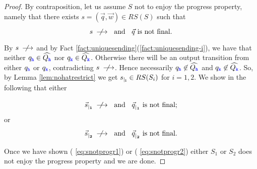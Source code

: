 \begin{proof}
By contraposition, let us assume $S$ not to enjoy the progress property, namely that there exists 
 $s= (\vec{q},\vec{w}) \in RS(S)$ such that
 \begin{equation}
 \label{eq:snotprogr}
 \text{$s\stackrel{}{\;\;\not\!\!\longrightarrow}\hspace{2mm}$ and $\hspace{2mm}\vec{q}$ is not final.}
\end{equation}


By $s\stackrel{}{\;\;\not\!\!\longrightarrow}$  and by Fact \ref{fact:uniquesending}(\ref{fact:uniquesending-i}), we have that
neither $q_{\mathtt{\color{blue}{ {h}}}}\in\widehat{Q_{\mathtt{\color{blue}{ {h}}}}}$ nor $q_{\mathtt{\color{blue}{ {k}}}}\in\widehat{Q_{\mathtt{\color{blue}{ {k}}}}}$. Otherwise
there will be an output transition from either $q_{\mathtt{\color{blue}{ {h}}}}$ or  $q_{\mathtt{\color{blue}{ {k}}}}$, contradicting $s\stackrel{}{\;\;\not\!\!\longrightarrow}$.
Hence necessarily $q_{\mathtt{\color{blue}{ {h}}}}\not\in\widehat{Q_{\mathtt{\color{blue}{ {h}}}}}$ and $q_{\mathtt{\color{blue}{ {k}}}}\not\in\widehat{Q_{\mathtt{\color{blue}{ {k}}}}}$. 
So, by Lemma \ref{lem:nohatrestrict} we get ${s}_{\mid_{\mathbf{i}}}\in RS(S_i)$ for $i=1,2$.
We show in the following that either

\begin{equation}
 \label{eq:snotprogr1}
\text{${\vec{s}}_{\mid_{\mathbf{1}}}\stackrel{}{\;\;\not\!\!\longrightarrow}\hspace{2mm}$ and $\hspace{2mm}{\vec{q}}_{\mid_{\mathbf{1}}}$ is not final;}
\end{equation}
or 
\begin{equation}
 \label{eq:snotprogr2}
\text{${\vec{s}}_{\mid_{\mathbf{2}}}\stackrel{}{\;\;\not\!\!\longrightarrow}\hspace{2mm}$ and $\hspace{2mm}{\vec{q}}_{\mid_{\mathbf{2}}}$ is not final.}
\end{equation}

Once we have shown ( \ref{eq:snotprogr1}) or ( \ref{eq:snotprogr2}) either $S_1$ or $S_2$ does not enjoy the progress property and we are done.







\end{proof}
